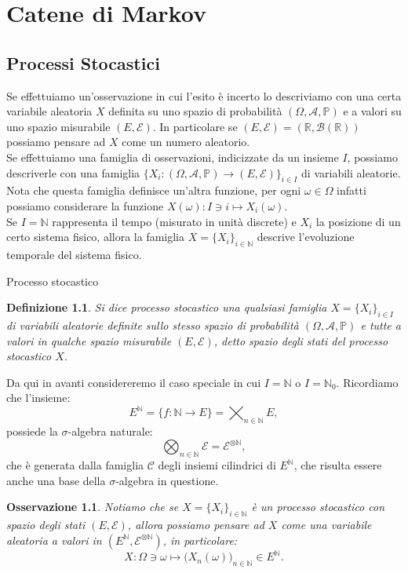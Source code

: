 \documentclass[11pt]{book}
\theoremstyle{Definizione}
\newtheorem*{mydef}{Definizione}
\theoremstyle{TeoremaProposizioneLemmaCorollario}
\theoremstyle{OsservazioneNota}
\newtheorem{myobs}{Osservazione}[section]
\newcommand{\R}{\mathbb{R}}
\newcommand{\N}{\mathbb{N}}
\renewcommand{\P}{\mathbb{P}}
\begin{document}
\chapter{Catene di Markov}
\section{Processi Stocastici}
Se effettuiamo un'osservazione in cui l'esito è incerto lo descriviamo con una certa variabile aleatoria $X$ definita su uno spazio di probabilità $(\Omega,\mathcal{A},\P)$ e a valori su uno spazio misurabile $(E,\mathcal{E})$. In particolare se $(E,\mathcal{E}) = (\R,\mathcal{B}(\R))$ possiamo pensare ad $X$ come un numero aleatorio.\\
Se effettuiamo una famiglia di osservazioni, indicizzate da un insieme $I$, possiamo descriverle con una famiglia $\{X_i:(\Omega,\mathcal{A},\P)\longrightarrow(E,\mathcal{E})\}_{i\in I}$ di variabili aleatorie. Nota che questa famiglia definisce un'altra funzione, per ogni $\omega\in \Omega$ infatti possiamo considerare la funzione $X(\omega):I\ni i \longmapsto X_i(\omega)$.\\
Se $I = \N$ rappresenta il tempo (misurato in unità discrete) e $X_i$ la posizione di un certo sistema fisico, allora la famiglia $X = \{X_i\}_{i\in \N}$ descrive l'evoluzione temporale del sistema fisico.
\begin{boxdef}{Processo stocastico}
\begin{mydef}
Si dice processo stocastico una qualsiasi famiglia $X = \{X_i\}_{i\in I}$ di variabili aleatorie definite sullo stesso spazio di probabilità $(\Omega,\mathcal{A},\P)$ e tutte a valori in qualche spazio misurabile $(E,\mathcal{E})$, detto spazio degli stati del processo stocastico $X$.
\end{mydef}
\end{boxdef}
\noindent
Da qui in avanti considereremo il caso speciale in cui $I = \N$ o $I = \N_0$. Ricordiamo che l'insieme:
$$
E^\N = \{f:\N \longrightarrow E\}  = \bigtimes_{n\in \N} E,
$$
possiede la $\sigma$-algebra naturale:
$$
\bigotimes_{n\in \N} \mathcal{E} = \mathcal{E}^{\otimes \N},
$$
che è generata dalla famiglia $\mathcal{C}$ degli insiemi cilindrici di $E^\N$, che risulta essere anche una base della $\sigma$-algebra in questione.
\begin{myobs}
Notiamo che se $X = \{X_i\}_{i\in \N}$ è un processo stocastico con spazio degli stati $(E,\mathcal{E})$, allora possiamo pensare ad $X$ come una variabile aleatoria a valori in $(E^\N,\mathcal{E}^{\otimes \N})$, in particolare:
\begin{equation}\label{eq:FunzioneRiassuntivaProcessoStocastico}
X:\Omega \ni \omega \longmapsto \big(X_n(\omega)\big)_{n\in \N} \in E^\N.
\end{equation}
\end{myobs}
\end{document}
